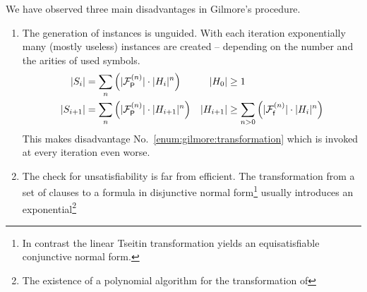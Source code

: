 We have observed three main disadvantages in Gilmore's procedure.
\begin{enumerate}
	\item\label{enum:gilmore:generation}
	 The generation of instances is unguided. 
	With each iteration exponentially many (mostly useless)
	instances are created
	-- depending on the number and the arities of used symbols.
\begin{align*}
	\lvert S_{i} \rvert &= \sum_n \left( \lvert {{\mathcal F}^{(n)}_{\mathsf P}} \rvert\cdot \lvert H_{i}\rvert^n \right)
	&
	\lvert H_0 \rvert &\geq 1	
	\\
	\lvert S_{i+1} \rvert &= \sum_n \left( \lvert {{\mathcal F}^{(n)}_{\mathsf P}} \rvert\cdot \lvert H_{i+1}\rvert^n \right)
	&
	\lvert H_{i+1}\rvert &\geq 
	\sum_{n>0}\left(
	\lvert{{\mathcal F}^{(n)}_{\mathsf f}}\rvert\cdot\lvert H_i \rvert^n
	\right) 
\end{align*}
		This makes disadvantage No.~\ref{enum:gilmore:transformation} 
		which is invoked at every iteration even worse.
	\item\label{enum:gilmore:transformation} 
	The check for unsatisfiability is far from efficient.
	The transformation from a set of clauses 
	to a formula in disjunctive normal form\footnote{
		In contrast the linear Tseitin transformation yields an equisatisfiable conjunctive normal form.
	}
	usually introduces an exponential\footnote{
		The existence of a polynomial algorithm 
		for the transformation of 
}
\end{enumerate}
